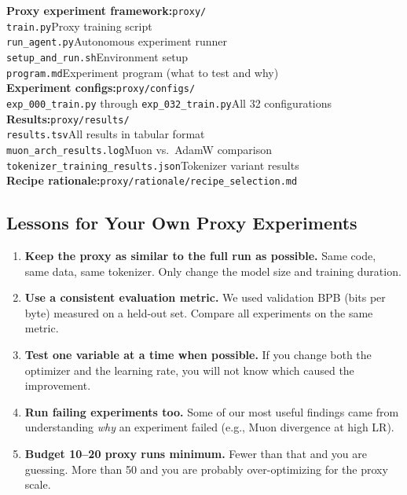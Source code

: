 \documentclass[11pt,a4paper]{article}
\begin{document}
\begin{reporef}
\textbf{Proxy experiment framework:}\hfill\texttt{proxy/}\\
\quad\texttt{train.py}\hfill Proxy training script\\
\quad\texttt{run\_agent.py}\hfill Autonomous experiment runner\\
\quad\texttt{setup\_and\_run.sh}\hfill Environment setup\\
\quad\texttt{program.md}\hfill Experiment program (what to test and why)\\
[4pt]
\textbf{Experiment configs:}\hfill\texttt{proxy/configs/}\\
\quad\texttt{exp\_000\_train.py} through \texttt{exp\_032\_train.py}\hfill All 32 configurations\\
[4pt]
\textbf{Results:}\hfill\texttt{proxy/results/}\\
\quad\texttt{results.tsv}\hfill All results in tabular format\\
\quad\texttt{muon\_arch\_results.log}\hfill Muon vs.\ AdamW comparison\\
\quad\texttt{tokenizer\_training\_results.json}\hfill Tokenizer variant results\\
[4pt]
\textbf{Recipe rationale:}\hfill\texttt{proxy/rationale/recipe\_selection.md}
\end{reporef}

\subsection{Lessons for Your Own Proxy Experiments}

\begin{enumerate}
    \item \textbf{Keep the proxy as similar to the full run as possible.} Same code, same data, same tokenizer. Only change the model size and training duration.
    \item \textbf{Use a consistent evaluation metric.} We used validation BPB (bits per byte) measured on a held-out set. Compare all experiments on the same metric.
    \item \textbf{Test one variable at a time when possible.} If you change both the optimizer and the learning rate, you will not know which caused the improvement.
    \item \textbf{Run failing experiments too.} Some of our most useful findings came from understanding \emph{why} an experiment failed (e.g., Muon divergence at high LR).
    \item \textbf{Budget 10--20 proxy runs minimum.} Fewer than that and you are guessing. More than 50 and you are probably over-optimizing for the proxy scale.
\end{enumerate}
\end{document}
